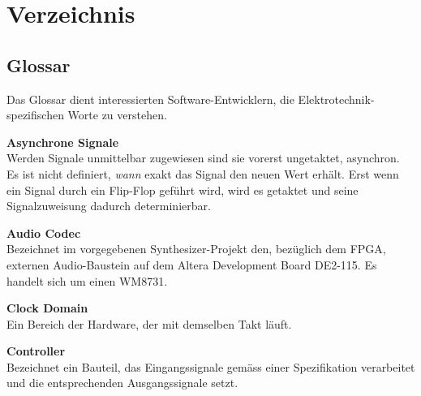
\chapter{Verzeichnis}\label{chap.verzeichnis}



\makeatletter
\renewcommand*\bib@heading{ \section{\refname}}
\makeatother



 


\section{Glossar}\label{sect.verzeichnis_glossar}

Das Glossar dient interessierten Software-Entwicklern, die Elektrotechnik-spezifischen Worte zu verstehen.

\textbf{Asynchrone Signale}\\
Werden Signale unmittelbar zugewiesen sind sie vorerst ungetaktet, asynchron. Es ist nicht definiert, \textit{wann} exakt das Signal den neuen Wert erhält. Erst wenn ein Signal durch ein Flip-Flop geführt wird, wird es getaktet und seine Signalzuweisung dadurch determinierbar.

\textbf{Audio Codec}\\
Bezeichnet im vorgegebenen Synthesizer-Projekt den, bezüglich dem FPGA, externen Audio-Baustein auf dem Altera Development Board DE2-115. Es handelt sich um einen WM8731.

\textbf{Clock Domain}\\
Ein Bereich der Hardware, der mit demselben Takt läuft.

\textbf{Controller}\\
Bezeichnet ein Bauteil, das Eingangssignale gemäss einer Spezifikation verarbeitet und die entsprechenden Ausgangssignale setzt.

